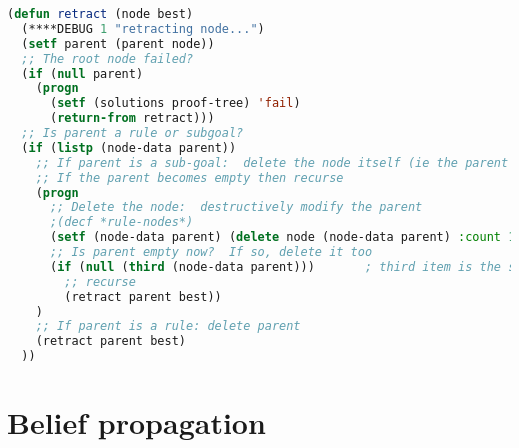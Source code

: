\begin{lstlisting}[language=Lisp]
(defun retract (node best)
  (****DEBUG 1 "retracting node...")
  (setf parent (parent node))
  ;; The root node failed?
  (if (null parent)
    (progn
      (setf (solutions proof-tree) 'fail)
      (return-from retract)))
  ;; Is parent a rule or subgoal?
  (if (listp (node-data parent))
    ;; If parent is a sub-goal:  delete the node itself (ie the parent's child);
    ;; If the parent becomes empty then recurse
    (progn
      ;; Delete the node:  destructively modify the parent
      ;(decf *rule-nodes*)
      (setf (node-data parent) (delete node (node-data parent) :count 1))
      ;; Is parent empty now?  If so, delete it too
      (if (null (third (node-data parent)))       ; third item is the subgoal's first argument
        ;; recurse
        (retract parent best))
    )
    ;; If parent is a rule: delete parent
    (retract parent best)
  ))
\end{lstlisting}

\section{Belief propagation}

